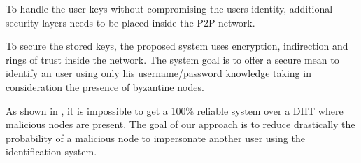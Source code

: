 To handle the user keys without compromising the users identity, additional
security layers needs to be placed inside the P2P network.

To secure the stored keys, the proposed system uses encryption, indirection and
rings of trust inside the network. The system goal is to offer a secure mean to
identify an user using only his username/password knowledge taking in
consideration the presence of byzantine nodes.

As shown in \cite{the_sybil_attack}, it is impossible to get a 100\% reliable
system over a DHT where malicious nodes are present. The goal of our approach
is to reduce drastically the probability of a malicious node to impersonate
another user using the identification system.
